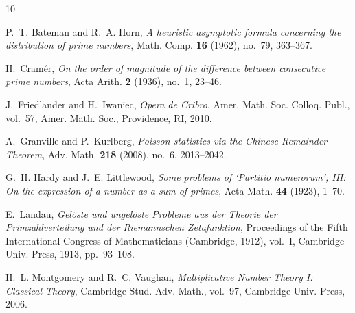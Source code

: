 \documentclass{amsart}
\theoremstyle{definition}
\theoremstyle{remark}
\numberwithin{equation}{section}
\begin{document}
\begin{thebibliography}{10}

P.~T. Bateman and R.~A. Horn,
\emph{A heuristic asymptotic formula concerning the distribution of prime numbers},
Math. Comp. \textbf{16} (1962), no.~79, 363--367.

H.~Cram\'er,
\emph{On the order of magnitude of the difference between consecutive prime numbers},
Acta Arith. \textbf{2} (1936), no.~1, 23--46.

J.~Friedlander and H.~Iwaniec,
\emph{Opera de Cribro},
Amer. Math. Soc. Colloq. Publ., vol.~57, Amer. Math. Soc., Providence, RI, 2010.

A.~Granville and P.~Kurlberg,
\emph{Poisson statistics via the Chinese Remainder Theorem},
Adv. Math. \textbf{218} (2008), no.~6, 2013--2042.

G.~H. Hardy and J.~E. Littlewood,
\emph{Some problems of `Partitio numerorum'; III: On the expression of a number as a sum of primes},
Acta Math. \textbf{44} (1923), 1--70.

E.~Landau,
\emph{Gel\"oste und ungel\"oste Probleme aus der Theorie der Primzahlverteilung und der Riemannschen Zetafunktion},
Proceedings of the Fifth International Congress of Mathematicians (Cambridge, 1912), vol.~I, Cambridge Univ. Press, 1913, pp.~93--108.

H.~L. Montgomery and R.~C. Vaughan,
\emph{Multiplicative Number Theory I: Classical Theory},
Cambridge Stud. Adv. Math., vol.~97, Cambridge Univ. Press, 2006.

\end{thebibliography}
\end{document}

